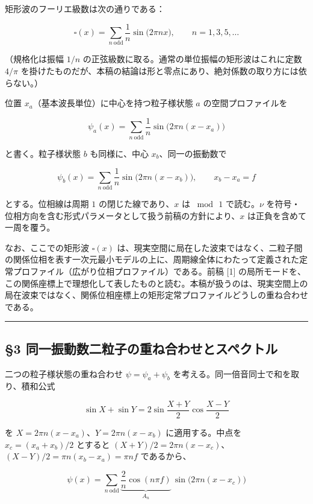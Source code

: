 \documentclass[
]{ltjsarticle}
\begin{document}
矩形波のフーリエ級数は次の通りである：

\[\square(x)=\sum_{n\ \mathrm{odd}}\frac{1}{n}\sin\!\big(2\pi n x\big),\qquad n=1,3,5,\dots\]

（規格化は振幅 \(1/n\)
の正弦級数に取る。通常の単位振幅の矩形波はこれに定数 \(4/\pi\)
を掛けたものだが、本稿の結論は形と零点にあり、絶対係数の取り方には依らない。）

位置 \(x_a\)（基本波長単位）に中心を持つ粒子様状態 \(a\)
の空間プロファイルを

\[\psi_a(x)=\sum_{n\ \mathrm{odd}}\frac{1}{n}\sin\!\big(2\pi n (x-x_a)\big)\]

と書く。粒子様状態 \(b\) も同様に、中心 \(x_b\)、同一の振動数で

\[\psi_b(x)=\sum_{n\ \mathrm{odd}}\frac{1}{n}\sin\!\big(2\pi n (x-x_b)\big),\qquad x_b-x_a=f\]

とする。位相線は周期 \(1\) の閉じた線であり、\(x\) は \(\bmod\,1\)
で読む。\(\nu\)
を符号・位相方向を含む形式パラメータとして扱う前稿の方針により、\(x\)
は正負を含めて一周を覆う。

なお、ここでの矩形波 \(\square(x)\)
は、現実空間に局在した波束ではなく、二粒子間の関係位相を表す一次元最小モデルの上に、周期線全体にわたって定義された定常プロファイル（広がり位相プロファイル）である。前稿
{[}1{]}
の局所モードを、この関係座標上で理想化して表したものと読む。本稿が扱うのは、現実空間上の局在波束ではなく、関係位相座標上の矩形定常プロファイルどうしの重ね合わせである。

\begin{center}\rule{0.5\linewidth}{0.5pt}\end{center}

\subsection{§3
同一振動数二粒子の重ね合わせとスペクトル}\label{ux540cux4e00ux632fux52d5ux6570ux4e8cux7c92ux5b50ux306eux91cdux306dux5408ux308fux305bux3068ux30b9ux30daux30afux30c8ux30eb}

二つの粒子様状態の重ね合わせ \(\psi=\psi_a+\psi_b\)
を考える。同一倍音同士で和を取り、積和公式

\[\sin X+\sin Y=2\sin\frac{X+Y}{2}\cos\frac{X-Y}{2}\]

を \(X=2\pi n(x-x_a)\)、\(Y=2\pi n(x-x_b)\) に適用する。中点を
\(x_c=(x_a+x_b)/2\) とすると
\((X+Y)/2=2\pi n(x-x_c)\)、\((X-Y)/2=\pi n(x_b-x_a)=\pi n f\)
であるから、

\[\boxed{\ \psi(x)=\sum_{n\ \mathrm{odd}}\underbrace{\frac{2}{n}\cos(n\pi f)}_{A_n}\,\sin\!\big(2\pi n(x-x_c)\big)\ }\]
\end{document}
